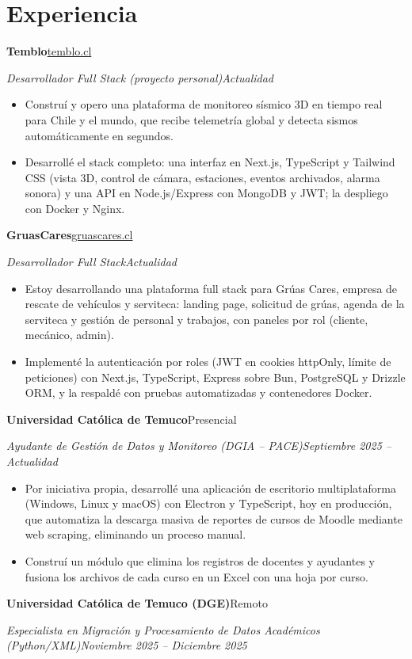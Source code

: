\documentclass[10pt,letterpaper]{article}
\newcommand{\entry}[4]{%
  \textbf{#1}\hfill #2\par\nopagebreak
  \textit{#3}\hfill \textit{#4}\par\nopagebreak\vspace{0.05em}}
\newcommand{\gap}{\vspace{0.22em}}
\begin{document}
\section{Experiencia}
\entry{Temblo}{\href{https://temblo.cl}{temblo.cl}}{Desarrollador Full Stack (proyecto personal)}{Actualidad}
\begin{itemize}
  \item Construí y opero una plataforma de monitoreo sísmico 3D en tiempo real para Chile y el mundo, que recibe telemetría global y detecta sismos automáticamente en segundos.
  \item Desarrollé el stack completo: una interfaz en Next.js, TypeScript y Tailwind CSS (vista 3D, control de cámara, estaciones, eventos archivados, alarma sonora) y una API en Node.js/Express con MongoDB y JWT; la despliego con Docker y Nginx.
\end{itemize}
\gap
\entry{GruasCares}{\href{https://gruascares.cl}{gruascares.cl}}{Desarrollador Full Stack}{Actualidad}
\begin{itemize}
  \item Estoy desarrollando una plataforma full stack para Grúas Cares, empresa de rescate de vehículos y serviteca: landing page, solicitud de grúas, agenda de la serviteca y gestión de personal y trabajos, con paneles por rol (cliente, mecánico, admin).
  \item Implementé la autenticación por roles (JWT en cookies httpOnly, límite de peticiones) con Next.js, TypeScript, Express sobre Bun, PostgreSQL y Drizzle ORM, y la respaldé con pruebas automatizadas y contenedores Docker.
\end{itemize}
\gap
\entry{Universidad Católica de Temuco}{Presencial}{Ayudante de Gestión de Datos y Monitoreo (DGIA -- PACE)}{Septiembre 2025 -- Actualidad}
\begin{itemize}
  \item Por iniciativa propia, desarrollé una aplicación de escritorio multiplataforma (Windows, Linux y macOS) con Electron y TypeScript, hoy en producción, que automatiza la descarga masiva de reportes de cursos de Moodle mediante web scraping, eliminando un proceso manual.
  \item Construí un módulo que elimina los registros de docentes y ayudantes y fusiona los archivos de cada curso en un Excel con una hoja por curso.
\end{itemize}
\gap
\entry{Universidad Católica de Temuco (DGE)}{Remoto}{Especialista en Migración y Procesamiento de Datos Académicos (Python/XML)}{Noviembre 2025 -- Diciembre 2025}
\end{document}
